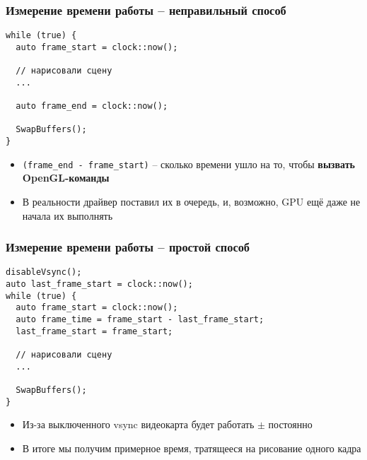 \documentclass{beamer}
\begin{document}
\begin{frame}[fragile]
\frametitle{Измерение времени работы -- неправильный способ}
\begin{verbatim}
while (true) {
  auto frame_start = clock::now();

  // нарисовали сцену
  ...

  auto frame_end = clock::now();

  SwapBuffers();
}
\end{verbatim}
\pause
\begin{itemize}
\item \verb|(frame_end - frame_start)| -- сколько времени ушло на то, чтобы \textbf{вызвать OpenGL-команды}
\pause
\item В реальности драйвер поставил их в очередь, и, возможно, GPU ещё даже не начала их выполнять
\end{itemize}
\end{frame}

\begin{frame}[fragile]
\frametitle{Измерение времени работы -- простой способ}
\begin{verbatim}
disableVsync();
auto last_frame_start = clock::now();
while (true) {
  auto frame_start = clock::now();
  auto frame_time = frame_start - last_frame_start;
  last_frame_start = frame_start;

  // нарисовали сцену
  ...

  SwapBuffers();
}
\end{verbatim}
\pause
\begin{itemize}
\item Из-за выключенного vsync видеокарта будет работать \begin{math}\pm\end{math} постоянно
\pause
\item В итоге мы получим примерное время, тратящееся на рисование одного кадра
\end{itemize}
\end{frame}
\end{document}
